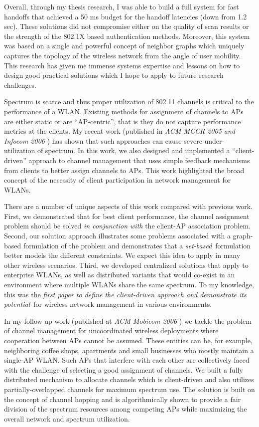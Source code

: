 \documentclass[10pt,letterpaper]{article}
\begin{document}
Overall, through my thesis research, I was able to build a full system for fast handoffs that achieved a 50 ms budget
for the handoff latencies (down from 1.2 sec). These solutions did not compromise either on the quality of scan results
or the strength of the 802.1X based authentication methods. Moreover, this system was based on a single and powerful
concept of neighbor graphs which uniquely captures the topology of the wireless network from the angle of user mobility.
This research has given me immense systems expertise and lessons on how to design good practical solutions which I hope
to apply to future research challenges.



 Spectrum is scarce and thus proper utilization of 802.11
channels is critical to the performance of a WLAN. Existing methods for assignment of channels to APs are either static
or are ``AP-centric'', that is they do not capture performance metrics at the clients. My recent work (published 
in {\it ACM MCCR 2005 and Infocom 2006 }) has shown that such approaches can cause severe
under-utilization of spectrum. In this work, we also designed and implemented a ``client-driven'' approach to channel
management  that uses simple feedback mechanisms from clients to better assign channels to APs. This work highlighted
the broad concept of the necessity of client participation in network management for WLANs.


There are a number of unique aspects of this work compared with previous work.  First, we demonstrated that for best
client performance, the channel assignment problem should be solved {\em in conjunction with} the client-AP association
problem.  Second, our solution approach illustrates some problems associated with a graph-based formulation of the
problem and demonstrates that a {\em set-based}\ formulation better models the different constraints. We expect this
idea to apply in many other wireless scenarios.  Third, we developed centralized solutions that apply to enterprise
WLANs, as well as distributed variants that would co-exist in an environment where multiple WLANs share the same
spectrum. To my knowledge, this was the {\em first paper to define the client-driven approach and demonstrate its
potential}\ for wireless network management in various environments.

In my follow-up work (published at {\it ACM Mobicom 2006 }) we tackle the problem of channel
management for  uncoordinated wireless deployments where cooperation between APs cannot be assumed. These entities can
be, for example, neighboring coffee shops, apartments and small businesses who mostly maintain a single-AP WLAN. Such
APs that interfere with each other are collectively faced with the challenge of selecting a good assignment of channels.
We built a fully distributed mechanism to allocate channels which is client-driven and also utilizes
partially-overlapped channels for maximum spectrum use. The solution is built on the concept of channel hopping and is
algorithmically shown to provide a fair division of the spectrum resources among competing APs while maximizing the
overall network and spectrum utilization.
\end{document}
